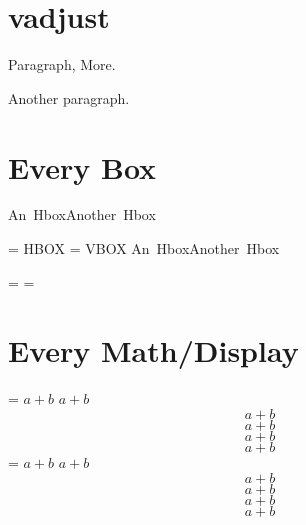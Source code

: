 \documentclass{article}
\begin{document}
\section{vadjust}
Paragraph, More.

Another paragraph.

\section{Every Box}

\def\HBox{ HBOX }
\def\VBox{ VBOX }

\vbox{\hbox{An Hbox}\hbox{Another Hbox}}

\everyhbox={\HBox}
\everyvbox={\VBox}
\vbox{\hbox{An Hbox}\hbox{Another Hbox}}

\everyhbox={}
\everyvbox={}

\section{Every Math/Display}
{
 \everymath={\rightarrow}
 $a+b$
 \begin{math} a + b \end{math}
 $$a+b$$
\[a+b\]
 \begin{displaymath} a + b \end{displaymath}
 \begin{equation} a + b \end{equation}
}
{
 \everydisplay={\rightarrow}
 $a+b$
 \begin{math} a + b \end{math}
 $$a+b$$
\[a+b\]
 \begin{displaymath} a + b \end{displaymath}
 \begin{equation} a + b \end{equation}
}

\end{document}
